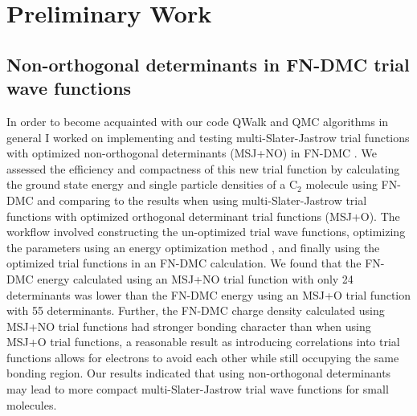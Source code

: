 \documentclass[12pt]{article}
\begin{document}
\section{Preliminary Work}
\subsection{Non-orthogonal determinants in FN-DMC trial wave functions}
In order to become acquainted with our code QWalk \cite{WAGNER20093390} and QMC algorithms in general I worked on implementing and testing multi-Slater-Jastrow trial functions with optimized non-orthogonal determinants (MSJ+NO) in FN-DMC \cite{Pathak2018}.
We assessed the efficiency and compactness of this new trial function by calculating the ground state energy and single particle densities of a C$_2$ molecule using FN-DMC and comparing to the results when using multi-Slater-Jastrow trial functions with optimized orthogonal determinant trial functions (MSJ+O). 
The workflow involved constructing the un-optimized trial wave functions, optimizing the parameters using an energy optimization method \cite{Toulouse2007}, and finally using the optimized trial functions in an FN-DMC calculation. 
We found that the FN-DMC energy calculated using an MSJ+NO trial function with only 24 determinants was lower than the FN-DMC energy using an MSJ+O trial function with 55 determinants. 
Further, the FN-DMC charge density calculated using MSJ+NO trial functions had stronger bonding character than when using MSJ+O trial functions, a reasonable result as introducing correlations into trial functions allows for electrons to avoid each other while still occupying the same bonding region. 
Our results indicated that using non-orthogonal determinants may lead to more compact multi-Slater-Jastrow trial wave functions for small molecules.
\end{document}
